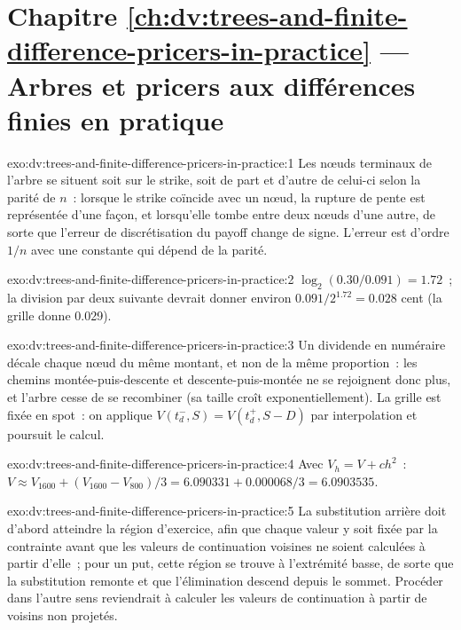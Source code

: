 \section*{Chapitre \ref{ch:dv:trees-and-finite-difference-pricers-in-practice} --- Arbres et pricers aux différences finies en pratique}

\begin{solution}{exo:dv:trees-and-finite-difference-pricers-in-practice:1}
Les nœuds terminaux de l'arbre se situent soit sur le strike, soit de part et d'autre de celui-ci selon la parité de $n$~: lorsque le strike coïncide avec un nœud, la rupture de pente
est représentée d'une façon, et lorsqu'elle tombe entre deux nœuds d'une autre, de sorte que l'erreur de discrétisation du payoff change de signe. L'erreur est d'ordre $1/n$ avec une
constante qui dépend de la parité.
\end{solution}

\begin{solution}{exo:dv:trees-and-finite-difference-pricers-in-practice:2}
$\log_2(0.30/0.091)=1.72$~; la division par deux suivante devrait donner environ $0.091/2^{1.72}=0.028$ cent (la grille donne 0.029).
\end{solution}

\begin{solution}{exo:dv:trees-and-finite-difference-pricers-in-practice:3}
Un dividende en numéraire décale chaque nœud du même montant, et non de la même proportion~: les chemins montée-puis-descente et descente-puis-montée ne se rejoignent donc plus, et
l'arbre cesse de se recombiner (sa taille croît exponentiellement). La grille est fixée en spot~: on applique $V(t_d^-,S)=V(t_d^+,S-D)$ par interpolation et
poursuit le calcul.
\end{solution}

\begin{solution}{exo:dv:trees-and-finite-difference-pricers-in-practice:4}
Avec $V_h=V+ch^2$~: $V\approx V_{1600}+(V_{1600}-V_{800})/3=6.090331+0.000068/3=6.0903535$.
\end{solution}

\begin{solution}{exo:dv:trees-and-finite-difference-pricers-in-practice:5}
La substitution arrière doit d'abord atteindre la région d'exercice, afin que chaque valeur y soit fixée par la contrainte avant que les valeurs de continuation voisines
ne soient calculées à partir d'elle~; pour un put, cette région se trouve à l'extrémité basse, de sorte que la substitution remonte et que l'élimination descend depuis le
sommet. Procéder dans l'autre sens reviendrait à calculer les valeurs de continuation à partir de voisins non projetés.
\end{solution}

